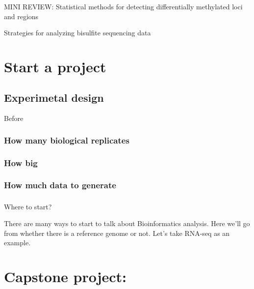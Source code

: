 \documentclass[]{book}
\begin{document}
\hypertarget{section-4}{%
\subsection{}\label{section-4}}

MINI REVIEW: Statistical methods for detecting differentially methylated loci and regions

Strategies for analyzing bisulfite sequencing data

\hypertarget{start-a-project}{%
\chapter{Start a project}\label{start-a-project}}

\hypertarget{experimetal-design}{%
\section{Experimetal design}\label{experimetal-design}}

Before

\hypertarget{how-many-biological-replicates}{%
\subsection{How many biological replicates}\label{how-many-biological-replicates}}

\hypertarget{how-big}{%
\subsection{How big}\label{how-big}}

\hypertarget{how-much-data-to-generate}{%
\subsection{How much data to generate}\label{how-much-data-to-generate}}

\hypertarget{section-5}{%
\subsection{}\label{section-5}}

Where to start?

There are many ways to start to talk about Bioinformatics analysis. Here we'll go from whether there is a reference genome or not. Let's take RNA-seq as an example.

\hypertarget{capstone-project}{%
\chapter{Capstone project:}\label{capstone-project}}
\end{document}
